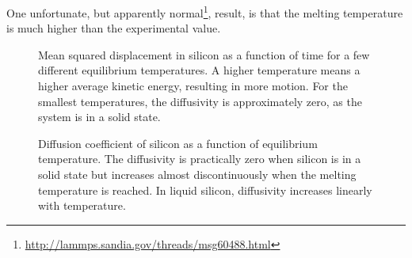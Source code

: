 \documentclass[11pt,british,a4paper]{report}
\begin{document}
One unfortunate, but apparently normal\footnote{\url{http://lammps.sandia.gov/threads/msg60488.html}}, result, is that the melting temperature is much higher than the experimental value.

\begin{figure}[htbp]
    \centering
    \caption{Mean squared displacement in silicon as a function of time for a few different equilibrium temperatures. A higher temperature means a higher average kinetic energy, resulting in more motion. For the smallest temperatures, the diffusivity is approximately zero, as the system is in a solid state.}%
    \label{fig:msdtimesi}
\end{figure}
\begin{figure}[htbp]
    \centering
    \caption{Diffusion coefficient of silicon as a function of equilibrium temperature. The diffusivity is practically zero when silicon is in a solid state but increases almost discontinuously when the melting temperature is reached. In liquid silicon, diffusivity increases linearly with temperature.}\label{fig:siD}
\end{figure}
\end{document}
